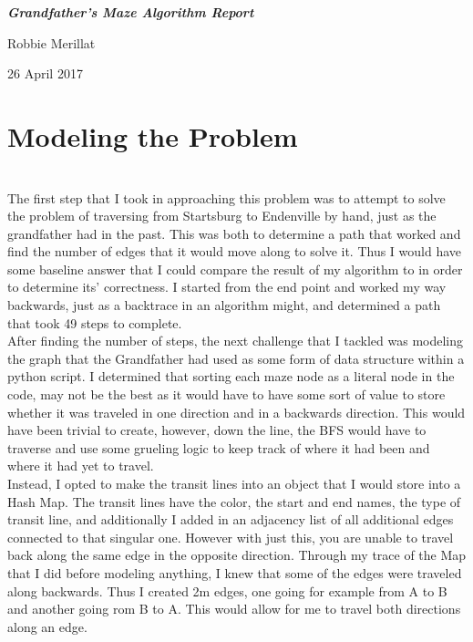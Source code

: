 \documentclass[12pt]{article}
\newcommand\tab[1][.5in]{\hspace*{#1}}
\begin{document}
\begin{titlepage}
\vspace*{\fill}
{
    \centering
    \bfseries
    \emph{\Huge Grandfather's Maze Algorithm Report}
    \vskip 1.5in

    \Large Robbie Merillat \\
    \vskip 2in

    26 April 2017

}
\vspace*{\fill}
\clearpage
\end{titlepage}

\section{Modeling the Problem}~\\
\tab The first step that I took in approaching this problem was to attempt to solve the problem of traversing from Startsburg to Endenville by hand, just as the grandfather had in the past. This was both to determine a path that worked and find the number of edges that it would move along to solve it. Thus I would have some baseline answer that I could compare the result of my algorithm to in order to determine its' correctness. I started from the end point and worked my way backwards, just as a backtrace in an algorithm might, and determined a path that took 49 steps to complete.\\
\tab After finding the number of steps, the next challenge that I tackled was modeling the graph that the Grandfather had used as some form of data structure within a python script. I determined that sorting each maze node as a literal node in the code, may not be the best as it would have to have some sort of value to store whether it was traveled in one direction and in a backwards direction. This would have been trivial to create, however, down the line, the BFS would have to traverse and use some grueling logic to keep track of where it had been and where it had yet to travel.\\
\tab Instead, I opted to make the transit lines into an object that I would store into a Hash Map. The transit lines have the color, the start and end names, the type of transit line, and additionally I added in an adjacency list of all additional edges connected to that singular one. However with just this, you are unable to travel back along the same edge in the opposite direction. Through my trace of the Map that I did before modeling anything, I knew that some of the edges were traveled along backwards. Thus I created 2m edges, one going for example from A to B and another going rom B to A. This would allow for me to travel both directions along an edge.\\
\end{document}
